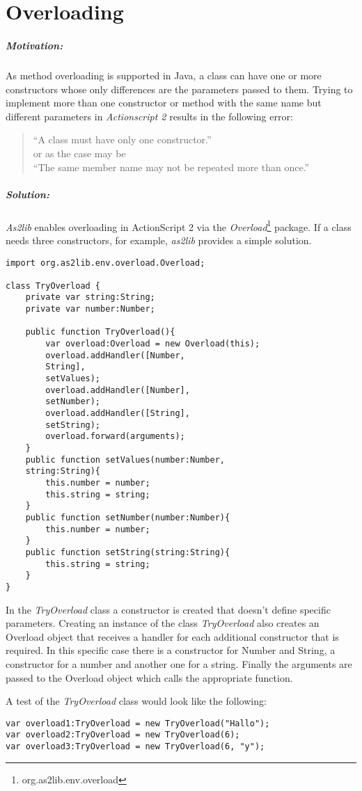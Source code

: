 \chapter{Overloading}
\label{sec:Overloading}

\paragraph{Motivation:}

As method overloading is supported in Java, a class can have one or more constructors whose only differences are the parameters passed to them. Trying to implement more than one constructor or method with the same name but different parameters in \emph{Actionscript 2} results in the following error:
\begin{quote}
	``A class must have only one constructor.''\\
	or as the case may be \\
	``The same member name may not be repeated more than once.''
\end{quote}

\paragraph{Solution:}

{\sl As2lib} enables overloading in ActionScript 2 via the \emph{Overload}\footnote{org.as2lib.env.overload} package. If a class needs three constructors, for example, {\sl as2lib} provides a simple solution.

\begin{lstlisting}[frame=single]
import org.as2lib.env.overload.Overload;

class TryOverload {
	private var string:String;
	private var number:Number;
	
	public function TryOverload(){
		var overload:Overload = new Overload(this);
		overload.addHandler([Number, 
		String], 
		setValues);
		overload.addHandler([Number], 
		setNumber);
		overload.addHandler([String],
		setString);
		overload.forward(arguments);
	}
	public function setValues(number:Number, 
	string:String){
		this.number = number;
		this.string = string;
	}
	public function setNumber(number:Number){
		this.number = number;
	}
	public function setString(string:String){
		this.string = string;
	}
}
\end{lstlisting}

In the \emph{TryOverload} class a constructor is created that doesn't define specific parameters. Creating an instance of the class \emph{TryOverload} also creates an Overload object that receives a handler for each additional constructor that is required. In this specific case there is a constructor for Number and String, a constructor for a number and another one for a string. Finally the arguments are passed to the Overload object which calls the appropriate function.

A test of the \emph{TryOverload} class would look like the following:

\begin{lstlisting}[frame=single]
var overload1:TryOverload = new TryOverload("Hallo");
var overload2:TryOverload = new TryOverload(6);
var overload3:TryOverload = new TryOverload(6, "y");
\end{lstlisting}
